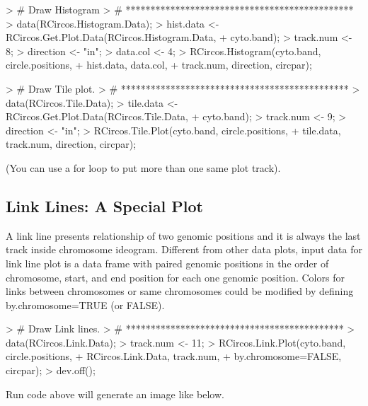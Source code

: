 \documentclass{article}
\begin{document}
\begin{Schunk}
\begin{Sinput}
> #	Draw Histogram
> #	**********************************************
> data(RCircos.Histogram.Data);
> hist.data <- RCircos.Get.Plot.Data(RCircos.Histogram.Data, 
+ 			cyto.band);
> track.num <- 8; 
> direction <- "in";
> data.col <- 4;
> RCircos.Histogram(cyto.band, circle.positions, 
+ 			hist.data, data.col, 
+ 			track.num, direction, circpar);
\end{Sinput}
\end{Schunk}

\begin{Schunk}
\begin{Sinput}
> #	Draw Tile plot. 
> #	**********************************************
> data(RCircos.Tile.Data);
> tile.data <- RCircos.Get.Plot.Data(RCircos.Tile.Data, 
+ 		cyto.band);
> track.num <- 9;
> direction <- "in";
> RCircos.Tile.Plot(cyto.band, circle.positions, 
+ 		tile.data, track.num, direction, circpar);
\end{Sinput}
\end{Schunk}

(You can use a for loop to put more than one same plot track).



\subsection{Link Lines: A Special Plot}

A link line presents relationship of two genomic positions and it is always the last track inside chromosome ideogram. Different from other data plots, input data for link line plot is a data frame with paired genomic positions in the order of chromosome, start, and end position for each one genomic position. Colors for links between chromosomes or same chromosomes could be modified by defining by.chromosome=TRUE (or FALSE).

\begin{Schunk}
\begin{Sinput}
> #	Draw Link lines.	
> #	********************************************
> data(RCircos.Link.Data);
> track.num <- 11;
> RCircos.Link.Plot(cyto.band, circle.positions, 
+ 			RCircos.Link.Data, track.num,  
+ 			by.chromosome=FALSE, circpar);
> dev.off();
\end{Sinput}
\end{Schunk}

Run code above will generate an image like below.
\end{document}

